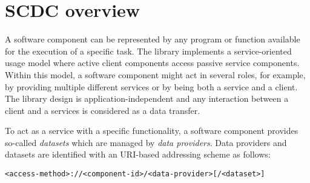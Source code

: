 \section{SCDC overview}

A software component can be represented by any program or function available for the execution of a specific task.
The library implements a service-oriented usage model where active client components access passive service components.
Within this model, a software component might act in several roles, for example, by providing multiple different services or by being both a service and a client.
The library design is application-independent and any interaction between a client and a services is considered as a data transfer.

To act as a service with a specific functionality, a software component provides so-called \textit{datasets} which are managed by \textit{data providers}.
Data providers and datasets are identified with an URI-based addressing scheme as follows:
\begin{alltt}
  <access-method>://<component-id>/<data-provider>[/<dataset>]
\end{alltt}
